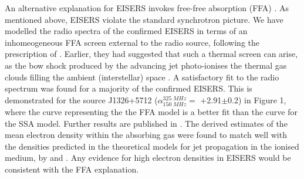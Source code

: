 \documentclass[proof]{WileyASNA-v1}
\begin{document}
An alternative explanation for EISERS invokes free-free absorption (FFA) \citep{Kellermann1966, Bicknell1997, Kuncic1998}. As mentioned above, EISERS violate the standard synchrotron picture. We have modelled the radio spectra of the confirmed EISERS in terms of an inhomeogeneous FFA screen external to the radio source, following the prescription of \citet{Bicknell2018}. Earlier, they had suggested that such a thermal screen can arise, as the bow shock produced by the advancing jet photo-ionises the thermal gas clouds filling the ambient (interstellar) space \citep{Bicknell1997}. A satisfactory fit to the radio spectrum was found for a majority of the confirmed EISERS. This is demonstrated for the source J1326+5712 ($\alpha^{325\;MHz}_{150\;MHz} =$ $+$2.91$\pm$0.2) in Figure 1, where the curve representing the the FFA model is a better fit than the curve for the SSA model. Further results are published in \citet{Mhaskey2019b}. The derived estimates of the mean electron density within the absorbing gas were found to match well with the densities predicted in the theoretical models for jet propagation in the ionised medium, by \citet{Begelman1996} and \citet{Bicknell1997}. Any evidence for high electron densities \citep[n$_{e}  >$100\,cm$^{-3}$,][]{Bicknell2018} in EISERS would be consistent with the FFA explanation. 

\end{document}
